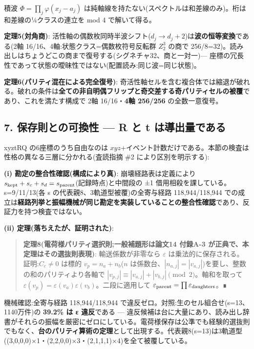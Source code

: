 \documentclass[
]{ltjsarticle}
\begin{document}
積波 \(\Phi=\prod_j\varphi(x_j-a_j)\)
は純軸線を持たない(スペクトルは和差線のみ)。桁は和差線の¼クラスの連立を
mod 4 で解いて得る。

\textbf{定理5(対角商)}:
活性軸の偶数枚同時半波シフト(\(d_j\to d_j+2\))は\textbf{波の恒等変換}である(2軸
16/16、4軸:状態クラス=偶数枚符号反転群 \(Z_2^3\) の商で
256/8=32)。読み出しはちょうどこの商まで復号する(シグネチャ32、商と一対一)---
座標の冗長性であって状態の曖昧性ではない(配置読み:同じ波=同じ状態)。

\textbf{定理6(パリティ混在による完全復号)}:
奇活性軸セルを含む複合体では縮退が破れる。破れの条件は\textbf{全ての非自明偶フリップと奇交差する奇パリティセルの被覆}であり、これを満たす構成で
2軸 16/16・\textbf{4軸 256/256} の全数一意復号。

\subsection{7. 保存則との可換性 --- R と t
は導出量である}\label{ux4fddux5b58ux5247ux3068ux306eux53efux63dbux6027-r-ux3068-t-ux306fux5c0eux51faux91cfux3067ux3042ux308b}

xyztRQ の6座標のうち自由なのは
\(xyz\)+イベント計数だけである。本節の検査は性格の異なる三層に分かれる(査読指摘
\#2 により区別を明示する):

\textbf{(i) 勘定の整合性確認(構成により真)}: 崩壊経路表は定義により
\(s_{\rm kept}+s_c+s_d=s_{\rm parent}\)(記録時点)と中間段の ±1
借用相殺を課している。s=9/11/13(各 s の代表親8、3軌道型被覆)の全寄与経路
118,944/118,944
での成立は\textbf{経路列挙と振幅機械が同じ勘定を実装していることの整合性確認}であり、反証力を持つ検査ではない。

\textbf{(ii) 定理(落ちえたが、証明された)}:

\begin{quote}
\textbf{定理8(電荷様パリティ選択則;一般補題形は論文14 付録A-3
が正典で、本定理はその選抜則表現)}: 輸送係数が非零なら \(\varepsilon\)
は乗法的に保存される。証明:\(C_c\neq0\) は標的 \(v_p=n_a+n_b\)(\(n\)
は係数台、\(|n_{a,j}|=|v_{a,j}|\))を要し、整数の和のパリティより各軸で
\(|v_{p,j}|\equiv|v_{a,j}|+|v_{b,j}|\pmod 2\)。軸和を取って
\(\varepsilon(v_p)=\varepsilon(v_a)\varepsilon(v_b)\)。二段に適用して
\(\varepsilon_{\rm parent}=\prod\varepsilon_{\rm daughters}\)。∎
\end{quote}

機械確認:全寄与経路 118,944/118,944
で違反ゼロ。対照:生のセル組合せ(s=13、1140万件)の \textbf{39.2\% は ε
違反}である ---
違反候補は台に大量にあり、読み出し辞書がそれらの振幅を厳密にゼロにしている。電荷様保存は公準でも経験的選抜則でもなく、\textbf{台のパリティ算術の定理}として出現する。代表親8(s=13)は3軌道型((3,0,0,0)×1・(2,2,0,0)×3・(2,1,1,1)×4)を全て被覆している。
\end{document}
